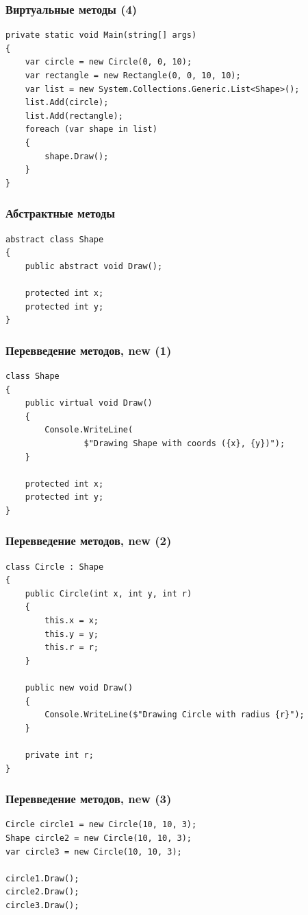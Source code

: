 \documentclass[xetex,mathserif,serif]{beamer}
\begin{document}
	\begin{frame}[fragile]
		\frametitle{Виртуальные методы (4)}
		\begin{verbatim}
private static void Main(string[] args)
{
    var circle = new Circle(0, 0, 10);
    var rectangle = new Rectangle(0, 0, 10, 10);
    var list = new System.Collections.Generic.List<Shape>();
    list.Add(circle);
    list.Add(rectangle);
    foreach (var shape in list)
    {
        shape.Draw();
    }
}
		\end{verbatim}
	\end{frame}

	\begin{frame}[fragile]
		\frametitle{Абстрактные методы}
		\begin{verbatim}
abstract class Shape
{
    public abstract void Draw();

    protected int x;
    protected int y;
}
		\end{verbatim}
\end{frame}

	\begin{frame}[fragile]
		\frametitle{Перевведение методов, new (1)}
		\begin{verbatim}
class Shape
{
    public virtual void Draw()
    {
        Console.WriteLine(
                $"Drawing Shape with coords ({x}, {y})");
    }

    protected int x;
    protected int y;
}
		\end{verbatim}
	\end{frame}

	\begin{frame}[fragile]
		\frametitle{Перевведение методов, new (2)}
		\begin{small}
			\begin{verbatim}
class Circle : Shape
{
    public Circle(int x, int y, int r)
    {
        this.x = x;
        this.y = y;
        this.r = r;
    }

    public new void Draw()
    {
        Console.WriteLine($"Drawing Circle with radius {r}");
    }

    private int r;
}
			\end{verbatim}
		\end{small}
	\end{frame}

	\begin{frame}[fragile]
		\frametitle{Перевведение методов, new (3)}
		\begin{verbatim}
Circle circle1 = new Circle(10, 10, 3);
Shape circle2 = new Circle(10, 10, 3);
var circle3 = new Circle(10, 10, 3);

circle1.Draw();
circle2.Draw();
circle3.Draw();
		\end{verbatim}
	\end{frame}
\end{document}
